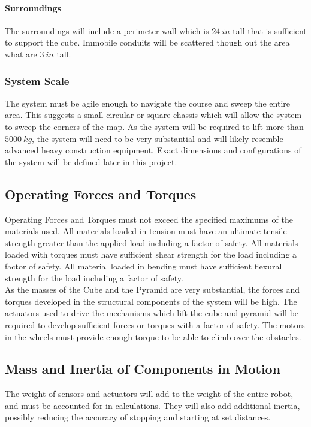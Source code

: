 \documentclass[12pt]{article}
\begin{document}
\paragraph{Surroundings} The surroundings will include a perimeter wall which is $24 \: in$ tall that is sufficient to support the cube. Immobile conduits will be scattered though out the area what are $3 \: in$ tall. 

\subsubsection{System Scale} 
The system must be agile enough to navigate the course and sweep the entire area. This suggests a small circular or square chassis which will allow the system to sweep the corners of the map. As the system will be required to lift more than $5000 \: kg$, the system will need to be very substantial and will likely resemble advanced heavy construction equipment. Exact dimensions and configurations of the system will be defined later in this project.

\subsection{Operating Forces and Torques}
Operating Forces and Torques must not exceed the specified maximums of the materials used. All materials loaded in tension must have an ultimate tensile strength greater than the applied load including a factor of safety. All materials loaded with torques must have sufficient shear strength for the load including a factor of safety. All material loaded in bending must have sufficient flexural strength for the load including a factor of safety.\\

As the masses of the Cube and the Pyramid are very substantial, the forces and torques developed in the structural components of the system will be high. The actuators used to drive the mechanisms which lift the cube and pyramid will be required to develop sufficient forces or torques with a factor of safety. The motors in the wheels must provide enough torque to be able to climb over the obstacles. 

\subsection{Mass and Inertia of Components in Motion}
The weight of sensors and actuators will add to the weight of the entire robot, and must be accounted for in calculations. They will also add additional inertia, possibly reducing the accuracy of stopping and starting at set distances.
\end{document}
